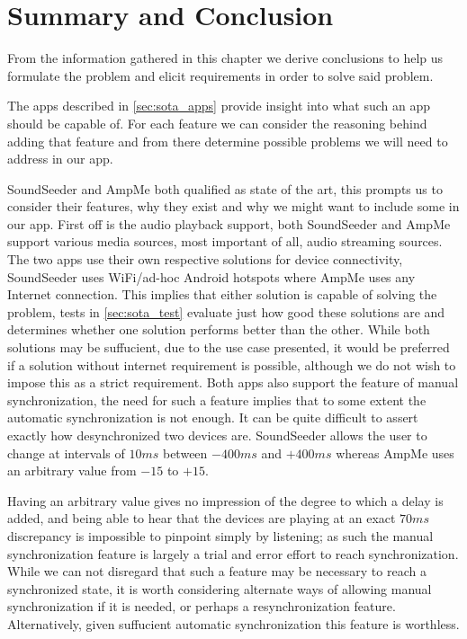 \section{Summary and Conclusion}
From the information gathered in this chapter we derive conclusions to help us formulate the problem and elicit requirements in order to solve said problem.

\bigskip
The apps described in \cref{sec:sota_apps} provide insight into what such an app should be capable of.
For each feature we can consider the reasoning behind adding that feature and from there determine possible problems we will need to address in our app.

SoundSeeder and AmpMe both qualified as state of the art, this prompts us to consider their features, why they exist and why we might want to include some in our app.
First off is the audio playback support, both SoundSeeder and AmpMe support various media sources, most important of all, audio streaming sources.
The two apps use their own respective solutions for device connectivity, SoundSeeder uses WiFi/ad-hoc Android hotspots where AmpMe uses any Internet connection.
This implies that either solution is capable of solving the problem, tests in \cref{sec:sota_test} evaluate just how good these solutions are and determines whether one solution performs better than the other.
While both solutions may be suffucient, due to the use case presented, it would be preferred if a solution without internet requirement is possible, although we do not wish to impose this as a strict requirement.
Both apps also support the feature of manual synchronization, the need for such a feature implies that to some extent the automatic synchronization is not enough.
It can be quite difficult to assert exactly how desynchronized two devices are.
SoundSeeder allows the user to change at intervals of $10 ms$ between $-400 ms$ and $+400 ms$ whereas AmpMe uses an arbitrary value from $-15$ to $+15$.

Having an arbitrary value gives no impression of the degree to which a delay is added, and being able to hear that the devices are playing at an exact $70ms$ discrepancy is impossible to pinpoint simply by listening; as such the manual synchronization feature is largely a trial and error effort to reach synchronization.
While we can not disregard that such a feature may be necessary to reach a synchronized state, it is worth considering alternate ways of allowing manual synchronization if it is needed, or perhaps a resynchronization feature.
Alternatively, given suffucient automatic synchronization this feature is worthless.

